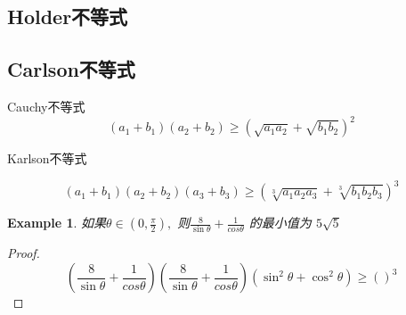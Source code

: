 \documentclass{ctexart}
\newtheorem*{example}{Example}
\begin{document}
\subsection{Holder不等式}
   
   \subsection{Carlson不等式}
   
 
   Cauchy不等式
   \[
   (a_1 + b_1)(a_2 + b_2) \geq  ( \sqrt{a_1 a_2} + \sqrt{b_1 b_2})^2 
   \]

	Karlson不等式
	
	\[
	(a_1 + b_1)(a_2 + b_2)(a_3 + b_3) \geq  ( \sqrt[3]{a_1 a_2 a_3} + \sqrt[3]{b_1 b_2 b_3})^3
	\]
	
	\begin{example}
		  如果\( \theta \in (0, \frac{\pi}{2} ), \) 则\( \frac{8}{\sin \theta} + \frac{1}{cos \theta} \) 的最小值为 \( 5 \sqrt{5} \)
		
	\end{example}
	
	\begin{proof}
		\begin{equation*}
			(\frac{8}{\sin \theta} + \frac{1}{cos \theta})( \frac{8}{\sin \theta} + \frac{1}{cos \theta}) (\sin^2 \theta + \cos^2 \theta) \geq ()^3
		\end{equation*}
	\end{proof}
\end{document}
